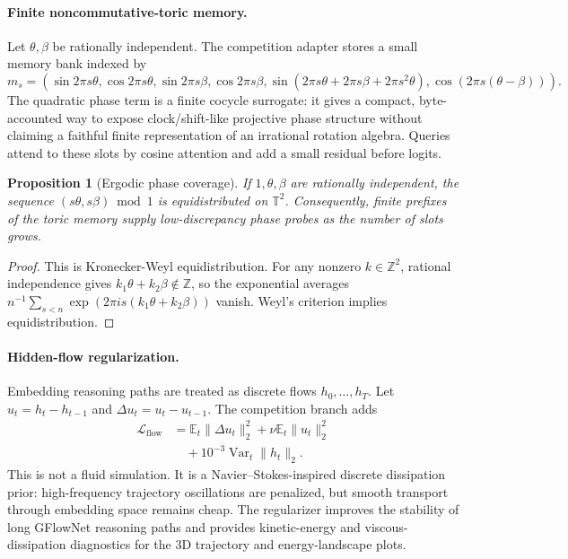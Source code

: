 \documentclass[10pt]{article}
\theoremstyle{definition}
\theoremstyle{plain}
\newtheorem{proposition}[definition]{Proposition}
\theoremstyle{remark}
\newcommand{\Eop}{\mathbb E}
\begin{document}
\paragraph{Finite noncommutative-toric memory.}
Let $\theta,\beta$ be rationally independent.  The competition adapter stores a small memory bank indexed by
\begin{equation}
  m_s=(\sin 2\pi s\theta,\cos 2\pi s\theta,\sin 2\pi s\beta,\cos 2\pi s\beta,
  \sin(2\pi s\theta+2\pi s\beta+2\pi s^2\theta),\cos(2\pi s(\theta-\beta))).
\end{equation}
The quadratic phase term is a finite cocycle surrogate: it gives a compact, byte-accounted way to expose clock/shift-like projective phase structure without claiming a faithful finite representation of an irrational rotation algebra.  Queries attend to these slots by cosine attention and add a small residual before logits.

\begin{proposition}[Ergodic phase coverage]
If $1,\theta,\beta$ are rationally independent, the sequence $(s\theta,s\beta)\bmod1$ is equidistributed on $\mathbb T^2$.  Consequently, finite prefixes of the toric memory supply low-discrepancy phase probes as the number of slots grows.
\end{proposition}

\begin{proof}
This is Kronecker-Weyl equidistribution.  For any nonzero $k\in\mathbb Z^2$, rational independence gives $k_1\theta+k_2\beta\notin\mathbb Z$, so the exponential averages $n^{-1}\sum_{s<n}\exp(2\pi i s(k_1\theta+k_2\beta))$ vanish.  Weyl's criterion implies equidistribution.
\end{proof}

\paragraph{Hidden-flow regularization.}
Embedding reasoning paths are treated as discrete flows $h_0,\ldots,h_T$.
Let $u_t=h_t-h_{t-1}$ and $\Delta u_t=u_t-u_{t-1}$.  The competition branch adds
\begin{align}
  \mathcal L_{\mathrm{flow}}
  &=
  \Eop_t\|\Delta u_t\|_2^2
  +\nu \Eop_t\|u_t\|_2^2 \nonumber\\
  &\quad
  +10^{-3}\operatorname{Var}_t\|h_t\|_2.
\end{align}
This is not a fluid simulation.  It is a Navier--Stokes-inspired discrete dissipation prior: high-frequency trajectory oscillations are penalized, but smooth transport through embedding space remains cheap.  The regularizer improves the stability of long GFlowNet reasoning paths and provides kinetic-energy and viscous-dissipation diagnostics for the 3D trajectory and energy-landscape plots.
\end{document}
